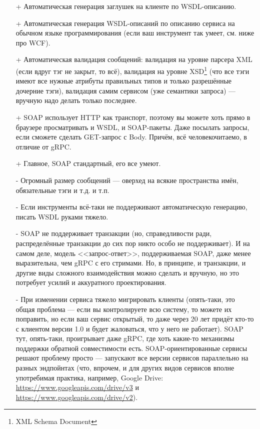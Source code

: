 \documentclass[a5paper]{article}
\begin{document}
\begin{itemize}
    \item[+] Автоматическая генерация заглушек на клиенте по WSDL-описанию.
    \item[+] Автоматическая генерация WSDL-описаний по описанию сервиса на обычном языке программирования (если ваш инструмент так умеет, см. ниже про WCF).
    \item[+] Автоматическая валидация сообщений: валидация на уровне парсера XML (если вдруг тэг не закрыт, то всё), валидация на уровне XSD\footnote{XML Schema Document} (что все тэги имеют все нужные атрибуты правильных типов и только разрешённые дочерние тэги), валидация самим сервисом (уже семантики запроса) --- вручную надо делать только последнее.
    \item[+] SOAP использует HTTP как транспорт, поэтому вы можете хоть прямо в браузере просматривать и WSDL, и SOAP-пакеты. Даже посылать запросы, если сможете сделать GET-запрос с Body. Причём, всё человекочитаемо, в отличие от gRPC.
    \item[+] Главное, SOAP стандартный, его все умеют.
    \item[-] Огромный размер сообщений --- оверхед  на всякие пространства имён, обязательные тэги и т.д. и т.п.
    \item[-] Если инструменты всё-таки не поддерживают автоматическую генерацию, писать WSDL руками тяжело.
    \item[-] SOAP не поддерживает транзакции (но, справедливости ради, распределённые транзакции до сих пор никто особо не поддерживает). И на самом деле, модель <<запрос-ответ>>, поддерживаемая SOAP, даже менее выразительна, чем gRPC с его стримами. Но, в принципе, и транзакции, и другие виды сложного взаимодействия можно сделать и вручную, но это потребует усилий и аккуратного проектирования.
    \item[-] При изменении сервиса тяжело мигрировать клиенты (опять-таки, это общая проблема --- если вы контролируете всю систему, то можете их поправить, но если ваш сервис открытый, то даже через 20 лет придёт кто-то с клиентом версии 1.0 и будет жаловаться, что у него не работает). SOAP тут, опять-таки, проигрывает даже gRPC, где хоть какие-то механизмы поддержки обратной совместимости есть. SOAP-ориентированные сервисы решают проблему просто --- запускают все версии сервисов параллельно на разных эндпойнтах (что, впрочем, и для других видов сервисов вполне употребимая практика, например, Google Drive: \url{https://www.googleapis.com/drive/v3} и \url{https://www.googleapis.com/drive/v2}).
\end{itemize}
\end{document}
